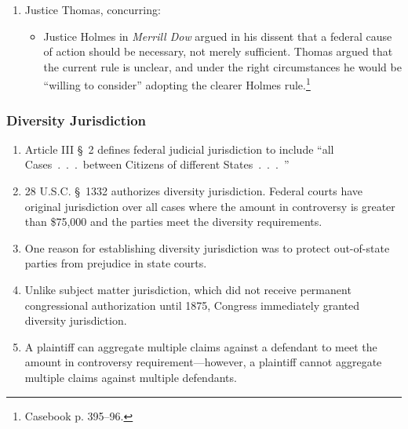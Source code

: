 \begin{enumerate}
\begin{itemize}
        approved balance of federal and state judicial 
        responsibilities.''\footnote{Casebook p. 392.}
        \item The Court saw the absence of a federal cause of action ``not as 
        a missing federal door key, always required, but as a missing welcome 
        mat, required in the circumstances~.~.~.~''\footnote{Casebook p. 394.}
        \item Affirmed.
    \end{itemize}
    \item Justice Thomas, concurring:
    \begin{itemize}
        \item Justice Holmes in \emph{Merrill Dow} argued in his dissent that 
        a federal cause of action should be necessary, not merely sufficient.  
        Thomas argued that the current rule is unclear, and under the right 
        circumstances he would be ``willing to consider'' adopting the clearer 
        Holmes rule.\footnote{Casebook p. 395--96.}
    \end{itemize}
\end{enumerate}

\subsubsection{Diversity Jurisdiction}

\begin{enumerate}
    \item Article III \S\ 2 defines federal judicial jurisdiction to include 
    ``all Cases~.~.~.~between Citizens of different States~.~.~.~''
    \item 28 U.S.C. \S\ 1332 authorizes diversity jurisdiction. Federal courts 
    have original jurisdiction over all cases where the amount in controversy 
    is greater than \$75,000 and the parties meet the diversity requirements.
    \item One reason for establishing diversity jurisdiction was to protect 
    out-of-state parties from prejudice in state courts.
    \item Unlike subject matter jurisdiction, which did not receive permanent 
    congressional authorization until 1875, Congress immediately granted 
    diversity jurisdiction.
    \item A plaintiff can aggregate multiple claims against a defendant to 
    meet the amount in controversy requirement---however, a plaintiff cannot 
    aggregate multiple claims against multiple defendants.
\end{enumerate}

